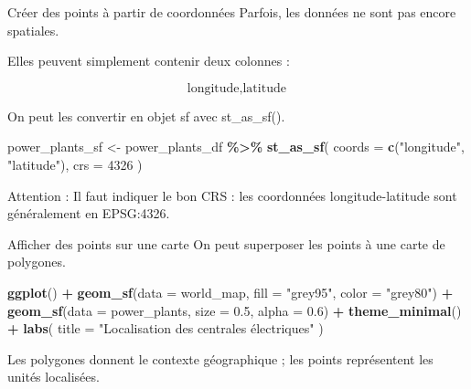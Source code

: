 \documentclass[
  10pt,
  ignorenonframetext,
]{beamer}
\newenvironment{Shaded}{\begin{snugshade}}{\end{snugshade}}
\newcommand{\AttributeTok}[1]{\textcolor[rgb]{0.13,0.29,0.53}{#1}}
\newcommand{\DecValTok}[1]{\textcolor[rgb]{0.00,0.00,0.81}{#1}}
\newcommand{\FloatTok}[1]{\textcolor[rgb]{0.00,0.00,0.81}{#1}}
\newcommand{\FunctionTok}[1]{\textcolor[rgb]{0.13,0.29,0.53}{\textbf{#1}}}
\newcommand{\NormalTok}[1]{#1}
\newcommand{\OtherTok}[1]{\textcolor[rgb]{0.56,0.35,0.01}{#1}}
\newcommand{\SpecialCharTok}[1]{\textcolor[rgb]{0.81,0.36,0.00}{\textbf{#1}}}
\newcommand{\StringTok}[1]{\textcolor[rgb]{0.31,0.60,0.02}{#1}}
\begin{document}
\begin{frame}[fragile]{Créer des points à partir de coordonnées}
\label{cruxe9er-des-points-uxe0-partir-de-coordonnuxe9es}
Parfois, les données ne sont pas encore spatiales.

Elles peuvent simplement contenir deux colonnes :

\[
\text{longitude}, \text{latitude}
\]

On peut les convertir en objet sf avec st\_as\_sf().

\begin{Shaded}
\begin{Highlighting}[]
\NormalTok{power\_plants\_sf }\OtherTok{\textless{}{-}}\NormalTok{ power\_plants\_df }\SpecialCharTok{\%\textgreater{}\%}
  \FunctionTok{st\_as\_sf}\NormalTok{(}
    \AttributeTok{coords =} \FunctionTok{c}\NormalTok{(}\StringTok{"longitude"}\NormalTok{, }\StringTok{"latitude"}\NormalTok{),}
    \AttributeTok{crs =} \DecValTok{4326}
\NormalTok{  )}
\end{Highlighting}
\end{Shaded}

Attention : Il faut indiquer le bon CRS : les coordonnées
longitude-latitude sont généralement en EPSG:4326.
\end{frame}

\begin{frame}[fragile]{Afficher des points sur une carte}
\label{afficher-des-points-sur-une-carte}
On peut superposer les points à une carte de polygones.

\begin{Shaded}
\begin{Highlighting}[]
\FunctionTok{ggplot}\NormalTok{() }\SpecialCharTok{+}
  \FunctionTok{geom\_sf}\NormalTok{(}\AttributeTok{data =}\NormalTok{ world\_map, }\AttributeTok{fill =} \StringTok{"grey95"}\NormalTok{, }\AttributeTok{color =} \StringTok{"grey80"}\NormalTok{) }\SpecialCharTok{+}
  \FunctionTok{geom\_sf}\NormalTok{(}\AttributeTok{data =}\NormalTok{ power\_plants, }\AttributeTok{size =} \FloatTok{0.5}\NormalTok{, }\AttributeTok{alpha =} \FloatTok{0.6}\NormalTok{) }\SpecialCharTok{+}
  \FunctionTok{theme\_minimal}\NormalTok{() }\SpecialCharTok{+}
  \FunctionTok{labs}\NormalTok{(}
    \AttributeTok{title =} \StringTok{"Localisation des centrales électriques"}
\NormalTok{  )}
\end{Highlighting}
\end{Shaded}

Les polygones donnent le contexte géographique ; les points représentent
les unités localisées.
\end{frame}
\end{document}
